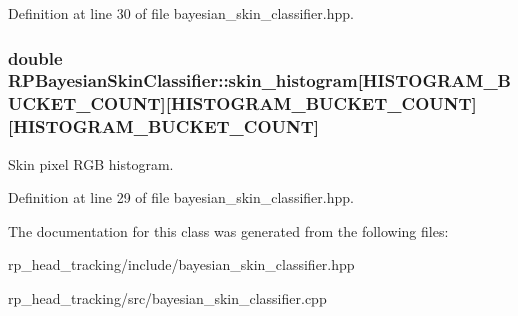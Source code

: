 \-Definition at line 30 of file bayesian\-\_\-skin\-\_\-classifier.\-hpp.

\hypertarget{class_r_p_bayesian_skin_classifier_a8fc9e22b862078ebfb15f678a03b6e24}{
\subsubsection[{skin\-\_\-histogram}]{\setlength{\rightskip}{0pt plus 5cm}double {\bf \-R\-P\-Bayesian\-Skin\-Classifier\-::skin\-\_\-histogram}\mbox{[}\-H\-I\-S\-T\-O\-G\-R\-A\-M\-\_\-\-B\-U\-C\-K\-E\-T\-\_\-\-C\-O\-U\-N\-T\mbox{]}\mbox{[}\-H\-I\-S\-T\-O\-G\-R\-A\-M\-\_\-\-B\-U\-C\-K\-E\-T\-\_\-\-C\-O\-U\-N\-T\mbox{]}\mbox{[}\-H\-I\-S\-T\-O\-G\-R\-A\-M\-\_\-\-B\-U\-C\-K\-E\-T\-\_\-\-C\-O\-U\-N\-T\mbox{]}}}\label{class_r_p_bayesian_skin_classifier_a8fc9e22b862078ebfb15f678a03b6e24}
\-Skin pixel \-R\-G\-B histogram. 

\-Definition at line 29 of file bayesian\-\_\-skin\-\_\-classifier.\-hpp.



\-The documentation for this class was generated from the following files\-:\begin{DoxyCompactItemize}
\item 
rp\-\_\-head\-\_\-tracking/include/bayesian\-\_\-skin\-\_\-classifier.\-hpp\item 
rp\-\_\-head\-\_\-tracking/src/bayesian\-\_\-skin\-\_\-classifier.\-cpp\end{DoxyCompactItemize}
